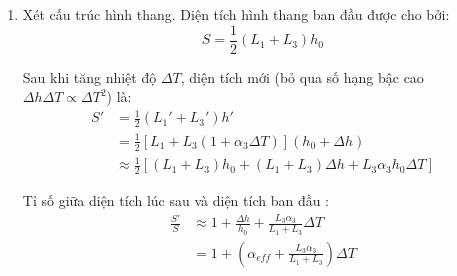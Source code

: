 \begin{enumerate}[label=(\alph*)]
Hệ số nở nhiệt hiệu dụng theo phương thẳng đứng của hình thang: 
\begin{equation}
\begin{aligned}
  \alpha_{eff}=\frac{\Delta h}{h_0\Delta T}&=\frac{4L_2^2\alpha_2 - L_3(L_3-L_1)\alpha_3}{4h_0^2} \\
  &=\frac{16L_2^2\alpha_2-4L_3(L_3-L_1)\alpha_3}{16L_2^2-(L_3-L_1)^2}
\end{aligned}
\end{equation}

Trạng thái của hệ phụ thuộc vào hệ số nở nhiệt hiệu dụng của hệ:
\begin{equation}
\begin{cases}
  \alpha_{eff}>0 \Leftrightarrow \dfrac{\alpha_2}{\alpha_3}>\dfrac{L_3(L_3-L_1)}{4L_2^2}, & \text{hệ nở chiều cao},\\[3mm]
  \alpha_{eff}<0 \Leftrightarrow \dfrac{\alpha_2}{\alpha_3}<\dfrac{L_3(L_3-L_1)}{4L_2^2}, & \text{hệ co chiều cao},\\[3mm]
  \alpha_{eff}=0 \Leftrightarrow \dfrac{\alpha_2}{\alpha_3}=\dfrac{L_3(L_3-L_1)}{4L_2^2}, & \text{hệ không đổi chiều cao}.
\end{cases}
\end{equation}

\item
Xét cấu trúc hình thang. Diện tích hình thang ban đầu được cho bởi:
\begin{equation}
S=\frac{1}{2}(L_1+L_3)h_0
\end{equation}

Sau khi tăng nhiệt độ $\Delta T$, diện tích mới (bỏ qua số hạng bậc cao $\Delta h \Delta T \propto \Delta T^2$) là:
\begin{equation}
\begin{aligned}
  S'&=\frac{1}{2}(L_1'+L_3')h' \\
  &=\frac{1}{2}\left[L_1+L_3(1+\alpha_3\Delta T)\right](h_0+\Delta h) \\
  &\approx \frac{1}{2}\left[(L_1+L_3)h_0 + (L_1+L_3)\Delta h + L_3\alpha_3 h_0 \Delta T\right]
\end{aligned}
\end{equation}

Tỉ số giữa diện tích lúc sau và diện tích ban đầu :
\begin{equation}
\begin{aligned}
  \frac{S'}{S} &\approx 1 + \frac{\Delta h}{h_0} + \frac{L_3\alpha_3}{L_1+L_3}\Delta T \\
  &= 1 + \left(\alpha_{eff} + \frac{L_3\alpha_3}{L_1+L_3}\right)\Delta T
\end{aligned}
\end{equation}


\end{enumerate}
